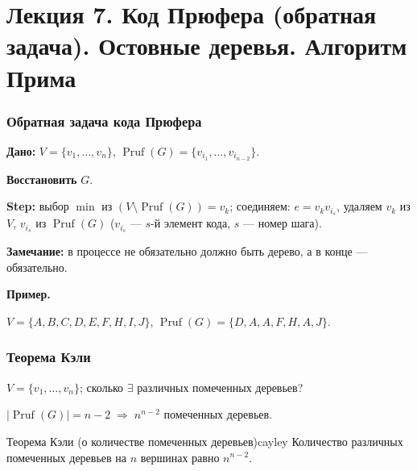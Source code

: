 \chapter{Лекция 7. Код Прюфера (обратная задача). Остовные деревья. Алгоритм Прима}


\subsection*{Обратная задача кода Прюфера}

\textbf{Дано:}
$V = \{v_1, \ldots, v_n\}$,\quad
$\operatorname{Pruf}(G) = \{v_{i_1}, \ldots, v_{i_{n-2}}\}$.

\textbf{Восстановить} $G$.

\textbf{Step:} выбор $\min$ из $(V \setminus \operatorname{Pruf}(G)) = v_k$; соединяем:
$e = v_k v_{i_s}$, удаляем $v_k$ из $V$, $v_{i_s}$ из $\operatorname{Pruf}(G)$
\quad ($v_{i_s}$ --- $s$-й элемент кода, $s$ --- номер шага).

\textbf{Замечание:} в процессе не обязательно должно быть дерево, а в конце --- обязательно.


\medskip
\noindent\textbf{Пример.}

$V = \{A, B, C, D, E, F, H, I, J\}$,\quad
$\operatorname{Pruf}(G) = \{D, A, A, F, H, A, J\}$.



\subsection*{Теорема Кэли}

$V = \{v_1, \ldots, v_n\}$; сколько $\exists$ различных помеченных деревьев?

$|\operatorname{Pruf}(G)| = n - 2 \;\Rightarrow\; n^{n-2}$ помеченных деревьев.

\begin{statement}{Теорема Кэли (о количестве помеченных деревьев)}{cayley}
Количество различных помеченных деревьев на $n$ вершинах равно $n^{n-2}$.
\end{statement}

